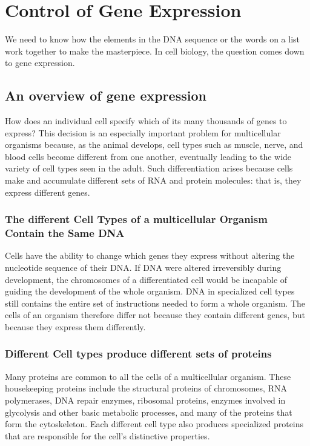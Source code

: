 \chapter{Control of Gene Expression}

We need to know how the elements in the DNA sequence or the words on a list work
together to make the masterpiece.
In cell biology, the question comes down to gene expression.

\section{An overview of gene expression}

How does an individual cell specify which of its many thousands of genes
to express? This decision is an especially important problem for multicellular 
organisms because, as the animal develops, cell types such as
muscle, nerve, and blood cells become different from one another, eventually 
leading to the wide variety of cell types seen in the adult. Such
differentiation arises because cells make and accumulate different sets
of RNA and protein molecules: that is, they express different genes.

\subsection{The different Cell Types of a multicellular Organism Contain the Same DNA}

Cells have the ability to change which genes they
express without altering the nucleotide sequence of their DNA. 
If DNA were altered irreversibly during development,
the chromosomes of a differentiated cell would be incapable of guiding 
the development of the whole organism. DNA in specialized cell types
still contains the entire set of instructions needed to form a whole organism. 
The cells of an organism therefore differ not because they contain
different genes, but because they express them differently.

\subsection{Different Cell types produce different sets of proteins}

Many proteins are common to all the cells of a multicellular organism. 
These housekeeping proteins include the structural
proteins of chromosomes, RNA polymerases, DNA repair enzymes, ribosomal 
proteins, enzymes involved in glycolysis and other basic metabolic
processes, and many of the proteins that form the cytoskeleton. Each different 
cell type also produces specialized proteins that are responsible for
the cell’s distinctive properties.

